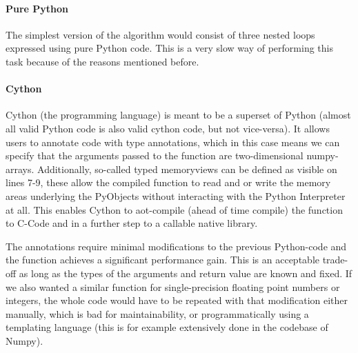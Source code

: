 \documentclass[english,11pt,a4paper,table]{article} %
\begin{document}
\paragraph{Pure Python}
\label{pure-python-dgemm}

The simplest version of the algorithm would consist of three nested loops expressed using pure Python code.
This is a very slow way of performing this task because of the reasons mentioned before.


\paragraph{Cython}
Cython (the programming language) is meant to be a superset of Python (almost all valid Python code is also valid cython code, but not vice-versa).
It allows users to annotate code with type annotations, which in this case means we can specify that the arguments passed to the function are two-dimensional numpy-arrays.
Additionally, so-called typed memoryviews can be defined as visible on lines 7-9, these allow the compiled function to read and or write the memory areas underlying the PyObjects without interacting with the Python Interpreter at all. \cite{TypedMem2:online}
This enables Cython to aot-compile (ahead of time compile) the function to C-Code and in a further step to a callable native library.

The annotations require minimal modifications to the previous Python-code and the function achieves a significant performance gain.
This is an acceptable trade-off as long as the types of the arguments and return value are known and fixed.
If we also wanted a similar function for single-precision floating point numbers or integers, the whole code would have to be repeated with that modification either manually, which is bad for maintainability,  or programmatically using a templating language (this is for example extensively done in the codebase of Numpy).
\end{document}
